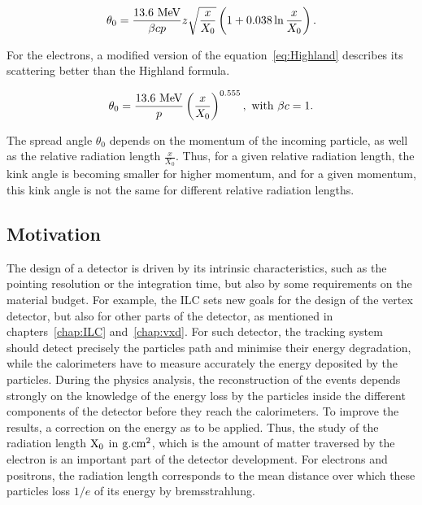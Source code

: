     \begin{equation}
      \theta_{0} = \frac{13.6~\rm{MeV}}{\beta c p} z \sqrt{\frac{x}{X_{0}}}\left(1 + 0.038 \ln{\frac{x}{X_{0}}}\right).
      \label{eq:Highland}
    \end{equation}

    For the electrons, a modified version of the equation~\ref{eq:Highland} describes its scattering better than the Highland formula\cite{GEANT4}.

    \begin{equation}
      \theta_{0} = \frac{13.6~\rm{MeV}}{p}\left(\frac{x}{X_{0}}\right)^{0.555},~\text{with $\beta c = 1$.}
    \end{equation}

    The spread angle $\theta_{0}$ depends on the momentum of the incoming particle, as well as the relative radiation length $\frac{x}{X_{0}}$.
    Thus, for a given relative radiation length, the kink angle is becoming smaller for higher momentum, and for a given momentum, this kink angle is not the same for different relative radiation lengths.

    \subsection{Motivation}

    The design of a detector is driven by its intrinsic characteristics, such as the pointing resolution or the integration time, but also by some requirements on the material budget.
    For example, the \gls{ILC} sets new goals for the design of the vertex detector, but also for other parts of the detector, as mentioned in chapters~\ref{chap:ILC} and~\ref{chap:vxd}.
    For such detector, the tracking system should detect precisely the particles path and minimise their energy degradation, while the calorimeters have to measure accurately the energy deposited by the particles.
    During the physics analysis, the reconstruction of the events depends strongly on the knowledge of the energy loss by the particles inside the different components of the detector before they reach the calorimeters. 
    To improve the results, a correction on the energy as to be applied.
    Thus, the study of the radiation length $\rm{X_{0}}$ in $\rm{g.cm}^{2}$, which is the amount of matter traversed by the electron is an important part of the detector development.
    For electrons and positrons, the radiation length corresponds to the mean distance over which these particles loss $1/e$ of its energy by bremsstrahlung.

